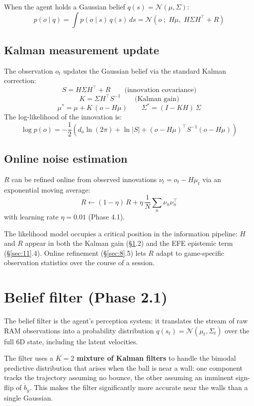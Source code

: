 \documentclass[12pt, a4paper]{article}
\newcommand{\1}{\mathbf{1}}
\newcommand{\cN}{\mathcal{N}}
\begin{document}
When the agent holds a Gaussian belief $q(s) = \cN(\mu, \Sigma)$:
\[
p(o \mid q)
= \int p(o \mid s)\, q(s)\, ds
= \cN\!\left(o \;;\; H\mu,\; H\Sigma H^\top + R\right)
\]

\subsection{Kalman measurement update}

The observation $o_t$ updates the Gaussian belief via the standard Kalman
correction:
\[
S = H\Sigma H^\top + R \qquad \text{(innovation covariance)}
\]
\[
K = \Sigma H^\top S^{-1} \qquad \text{(Kalman gain)}
\]
\[
\mu^* = \mu + K\,(o - H\mu)
\qquad
\Sigma^* = (I - KH)\,\Sigma
\]
The log-likelihood of the innovation is:
\[
\log p(o) = -\frac{1}{2}\left(
  d_o \ln(2\pi) + \ln|S|
  + (o - H\mu)^\top S^{-1}(o - H\mu)\right)
\]

\subsection{Online noise estimation}

$R$ can be refined online from observed innovations
$\nu_t = o_t - H\mu_t$ via an exponential moving average:
\[
R \leftarrow (1-\eta)\,R + \eta\,\frac{1}{N}\sum_n \nu_n \nu_n^\top
\]
with learning rate $\eta = 0.01$ (Phase 4.1).

The likelihood model occupies a critical position in the information pipeline:
$H$ and $R$ appear in both the Kalman gain (\S\ref{sec:9}.2) and the EFE
epistemic term (\S\ref{sec:11}.4).  Online refinement (\S\ref{sec:8}.5) lets $R$
adapt to game-specific observation statistics over the course of a session.

\section{Belief filter (Phase 2.1)}
\label{sec:9}

The belief filter is the agent's perception system: it translates the stream of
raw RAM observations into a probability distribution
$q(s_t) = \cN(\mu_t, \Sigma_t)$ over the full 6D state, including the latent
velocities.

The filter uses a \textbf{$K=2$ mixture of Kalman filters} to handle the bimodal
predictive distribution that arises when the ball is near a wall: one component
tracks the trajectory assuming no bounce, the other assuming an imminent sign-flip
of $\dot b_y$.  This makes the filter significantly more accurate near the walls
than a single Gaussian.
\end{document}
